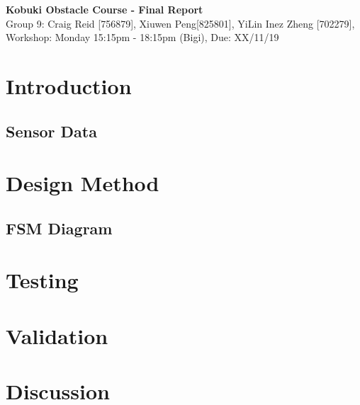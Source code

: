 \documentclass[11pt]{article}
\begin{document}

\begin{center}
\textbf{\Large{Kobuki Obstacle Course - Final Report}}\\
Group 9: Craig Reid [756879], Xiuwen Peng[825801], YiLin Inez Zheng [702279], \\
Workshop: Monday 15:15pm - 18:15pm (Bigi), Due: XX/11/19  
\end{center}

\section{Introduction}

\subsection{Sensor Data}

\section{Design Method}


\subsection{FSM Diagram}

\section{Testing}

\section{Validation}

\section{Discussion}
\end{document}
